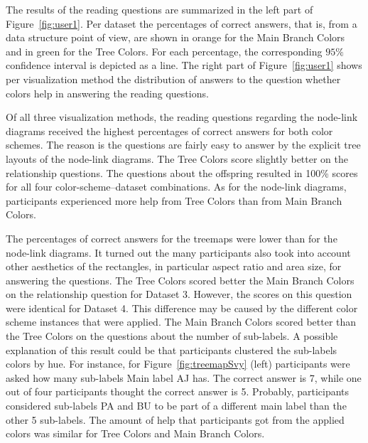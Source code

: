 \documentclass[review,journal]{vgtc}         %
\begin{document}
The results of the reading questions are summarized in the left part of Figure~\ref{fig:user1}. Per dataset the percentages of correct answers, that is, from a data structure point of view, are shown in orange for the Main Branch Colors and in green for the Tree Colors. For each percentage, the corresponding $95\%$ confidence interval is depicted as a line. The right part of Figure~\ref{fig:user1} shows per visualization method the distribution of answers to the question whether colors help in answering the reading questions.

Of all three visualization methods, the reading questions regarding the node-link diagrams received the highest percentages of correct answers for both color schemes. The reason is the questions are fairly easy to answer by the explicit tree layouts of the node-link diagrams. The Tree Colors score slightly better on the relationship questions. The questions about the offspring resulted in 100\% scores for all four color-scheme--dataset combinations. As for the node-link diagrams, participants experienced more help from Tree Colors than from Main Branch Colors.


The percentages of correct answers for the treemaps were lower than for the node-link diagrams. It turned out the many participants also took into account other aesthetics of the rectangles, in particular aspect ratio and area size, for answering the questions. The Tree Colors scored better the Main Branch Colors on the relationship question for Dataset 3. However, the scores on this question were identical for Dataset 4. This difference may be caused by the different color scheme instances that were applied. The Main Branch Colors scored better than the Tree Colors on the questions about the number of sub-labels. A possible explanation of this result could be that participants clustered the sub-labels colors by hue. For instance, for Figure~\ref{fig:treemapSvy} (left) participants were asked how many sub-labels Main label AJ has. The correct answer is 7, while one out of four participants thought the correct answer is 5. Probably, participants considered sub-labels PA and BU to be part of a different main label than the other 5 sub-labels. The amount of help that participants got from the applied colors was similar for Tree Colors and Main Branch Colors.
\end{document}
